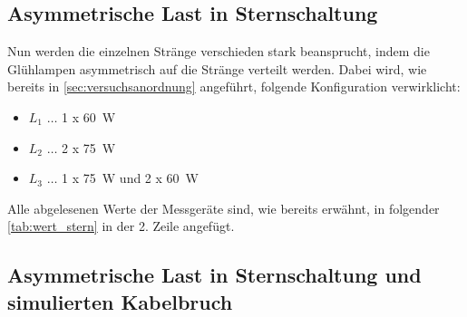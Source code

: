 \documentclass[12pt,english,ngerman]{scrartcl}
\begin{document}
\begin{table}[H]
	\caption[Abgelesene Werte bei Sternschaltung] {Abgelesene Werte bei Sternschaltung                                        \\
		1. Zeile \dots symmetrische Belastung                                      \\
		2. Zeile \dots asymmetrische Belastung                                     \\
		3. Zeile \dots asymmetrische Belastung mit simulierten Kabelbruch          \\
		$I_i \dots$ gemessener Strom am i-ten Strang in A                          \\
		$I_{31} \dots$ gemessener Strom zwischen Sternpunkt und Neutralleiter in A \\
		$U_{i} \dots$ gemessene Spannung am i-ten Strang in V                      \\
		$P_{i}^M \dots$ gemessene Wirkleistungen in W (für genaue Bezeichnung siehe \autoref{fig:aufbau2})
	}\label{tab:wert_stern}
	\centering
	
	
\end{table}

\subsection{Asymmetrische Last in Sternschaltung}

Nun werden die einzelnen Stränge verschieden stark beansprucht, indem die
Glühlampen asymmetrisch auf die Stränge verteilt werden. Dabei wird, wie
bereits in \autoref{sec:versuchsanordnung} angeführt, folgende Konfiguration
verwirklicht:

\begin{itemize}
	\item $L_1$ \(\dots\) 1 x \SI[]{60}{\watt}
	\item $L_2$ \(\dots\) 2 x \SI[]{75}{\watt}
	\item $L_3$ \(\dots\) 1 x \SI[]{75}{\watt} und 2 x \SI[]{60}{\watt}
\end{itemize}

Alle abgelesenen Werte der Messgeräte sind, wie bereits erwähnt, in folgender
\autoref{tab:wert_stern} in der 2. Zeile angefügt.

\subsection{Asymmetrische Last in Sternschaltung und simulierten Kabelbruch}
\end{document}
